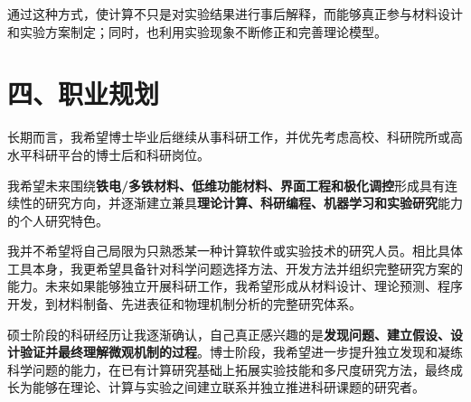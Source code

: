 通过这种方式，使计算不只是对实验结果进行事后解释，而能够真正参与材料设计和实验方案制定；同时，也利用实验现象不断修正和完善理论模型。

\section{四、职业规划}

长期而言，我希望博士毕业后继续从事科研工作，并优先考虑高校、科研院所或高水平科研平台的博士后和科研岗位。

我希望未来围绕\textbf{铁电/多铁材料、低维功能材料、界面工程和极化调控}形成具有连续性的研究方向，并逐渐建立兼具\textbf{理论计算、科研编程、机器学习和实验研究}能力的个人研究特色。

我并不希望将自己局限为只熟悉某一种计算软件或实验技术的研究人员。相比具体工具本身，我更希望具备针对科学问题选择方法、开发方法并组织完整研究方案的能力。未来如果能够独立开展科研工作，我希望形成从材料设计、理论预测、程序开发，到材料制备、先进表征和物理机制分析的完整研究体系。

硕士阶段的科研经历让我逐渐确认，自己真正感兴趣的是\textbf{发现问题、建立假设、设计验证并最终理解微观机制的过程}。博士阶段，我希望进一步提升独立发现和凝练科学问题的能力，在已有计算研究基础上拓展实验技能和多尺度研究方法，最终成长为能够在理论、计算与实验之间建立联系并独立推进科研课题的研究者。